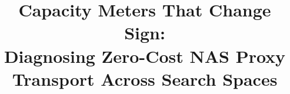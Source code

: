\documentclass[10pt,twocolumn,letterpaper]{article}
\begin{document}
\title{Capacity Meters That Change Sign:\\
Diagnosing Zero-Cost NAS Proxy Transport Across Search Spaces}
\author{}
\maketitle










{\small


}
\end{document}
